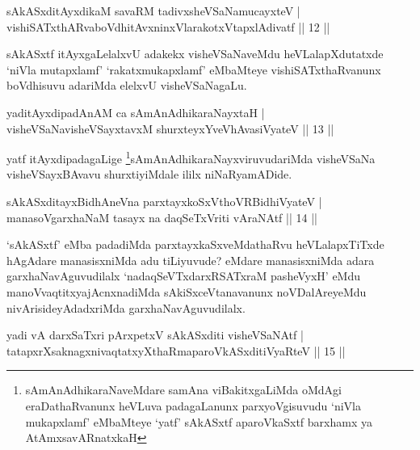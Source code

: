 \begin{shl}
sAkASxditAyxdikaM savaRM tadivxsheVSaNamucayxteV |\\
vishiSATxthARvaboVdhitAvxninxVlarakotxVtapxlAdivatf \hfill || 12 ||
\end{shl}

\begin{artha}
sAkASxtf itAyxgaLelalxvU adakekx visheVSaNaveMdu heVLalapXdutatxde `niVla mutapxlamf' `rakatxmukapxlamf' eMbaMteye vishiSATxthaRvanunx boVdhisuvu adariMda elelxvU visheVSaNagaLu.
\end{artha}

\begin{shl}
yaditAyxdipadAnAM ca sAmAnAdhikaraNayxtaH |\\
visheVSaNavisheVSayxtavxM shurxteyxYveVhAvasiVyateV \hfill || 13 ||
\end{shl}

\begin{artha}
yatf itAyxdipadagaLige \footnote{sAmAnAdhikaraNaveMdare samAna viBakitxgaLiMda oMdAgi eraDathaRvanunx heVLuva padagaLanunx parxyoVgisuvudu `niVla mukapxlamf' eMbaMteye `yatf' sAkASxtf aparoVkaSxtf barxhamx ya AtAmxsavARnatxkaH}sAmAnAdhikaraNayxviruvudariMda visheVSaNa visheVSayxBAvavu shurxtiyiMdale ililx niNaRyamADide.
\end{artha}


\begin{shl}
sAkASxditayxBidhAneVna parxtayxkoSxV\s thoVR\s BidhiVyateV |\\
manasoV\s garxhaNaM tasayx na daqSeTxVriti vAraNAtf \hfill || 14 ||
\end{shl}

\begin{artha}
`sAkASxtf' eMba padadiMda parxtayxkaSxveMdathaRvu heVLalapxTiTxde hAgAdare manasisxniMda adu tiLiyuvude? eMdare manasisxniMda adara garxhaNavAguvudilalx `nadaqSeVTxdarxRSATxraM pasheVyxH' eMdu manoVvaqtitxyajAcnxnadiMda sAkiSxceVtanavanunx noVDalAreyeMdu nivArisideyAdadxriMda garxhaNavAguvudilalx.
\end{artha}


\begin{shl}
yadi vA darxSaTxri pArxpetxV sAkASxditi visheVSaNAtf |\\
tatapxrXsaknagxnivaqtatxyXthaRmaparoVkASxditiVyaRteV \hfill || 15 ||
\end{shl}

